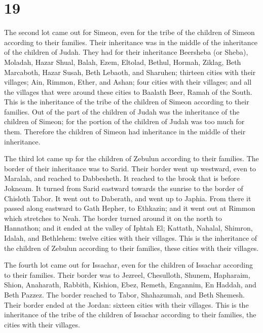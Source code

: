 \hypertarget{section-18}{%
\section{19}\label{section-18}}

 The second lot came out for Simeon, even for the tribe of
the children of Simeon according to their families. Their inheritance
was in the middle of the inheritance of the children of Judah.
 They had for their inheritance Beersheba (or Sheba),
Moladah,  Hazar Shual, Balah, Ezem, 
Eltolad, Bethul, Hormah,  Ziklag, Beth Marcaboth, Hazar
Susah,  Beth Lebaoth, and Sharuhen; thirteen cities with
their villages;  Ain, Rimmon, Ether, and Ashan; four
cities with their villages;  and all the villages that
were around these cities to Baalath Beer, Ramah of the South. This is
the inheritance of the tribe of the children of Simeon according to
their families.  Out of the part of the children of Judah
was the inheritance of the children of Simeon; for the portion of the
children of Judah was too much for them. Therefore the children of
Simeon had inheritance in the middle of their inheritance.

 The third lot came up for the children of Zebulun
according to their families. The border of their inheritance was to
Sarid.  Their border went up westward, even to Maralah,
and reached to Dabbesheth. It reached to the brook that is before
Jokneam.  It turned from Sarid eastward towards the
sunrise to the border of Chisloth Tabor. It went out to Daberath, and
went up to Japhia.  From there it passed along eastward
to Gath Hepher, to Ethkazin; and it went out at Rimmon which stretches
to Neah.  The border turned around it on the north to
Hannathon; and it ended at the valley of Iphtah El; 
Kattath, Nahalal, Shimron, Idalah, and Bethlehem: twelve cities with
their villages.  This is the inheritance of the children
of Zebulun according to their families, these cities with their
villages.

 The fourth lot came out for Issachar, even for the
children of Issachar according to their families.  Their
border was to Jezreel, Chesulloth, Shunem,  Hapharaim,
Shion, Anaharath,  Rabbith, Kishion, Ebez,
 Remeth, Engannim, En Haddah, and Beth Pazzez.
 The border reached to Tabor, Shahazumah, and Beth
Shemesh. Their border ended at the Jordan: sixteen cities with their
villages.  This is the inheritance of the tribe of the
children of Issachar according to their families, the cities with their
villages.


